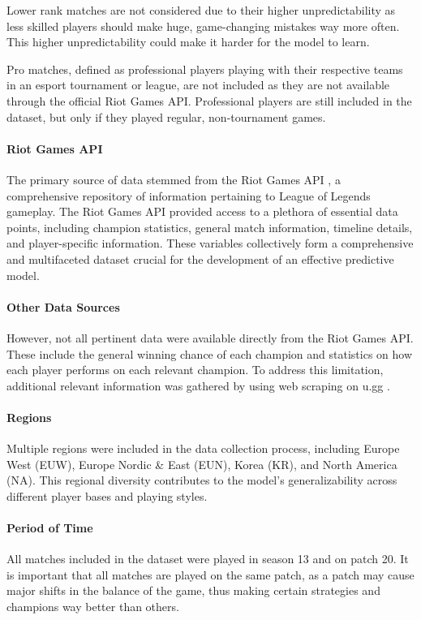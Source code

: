 \documentclass[12pt, a4paper, headinclude, twoside, plainheadsepline, open=right, numbers=noenddot, hidelinks, toc=listof, toc=bibliography]{scrreprt}
\begin{document}
Lower rank matches are not considered due to their higher unpredictability as less skilled players should make huge, game-changing mistakes way more often.
This higher unpredictability could make it harder for the model to learn.

Pro matches, defined as professional players playing with their respective teams in an esport tournament or league, are not included as they are not available through the official Riot Games API.
Professional players are still included in the dataset, but only if they played regular, non-tournament games.

\paragraph{Riot Games API}
The primary source of data stemmed from the Riot Games API \cite{RiotDeveloperPortal}, a comprehensive repository of information pertaining to League of Legends gameplay.
The Riot Games API provided access to a plethora of essential data points, including champion statistics, general match information, timeline details, and player-specific information.
These variables collectively form a comprehensive and multifaceted dataset crucial for the development of an effective predictive model.
\paragraph{Other Data Sources}
However, not all pertinent data were available directly from the Riot Games API.
These include the general winning chance of each champion and statistics on how each player performs on each relevant champion.
To address this limitation, additional relevant information was gathered by using web scraping on u.gg \cite{GGBestLeague}.
\paragraph{Regions}
Multiple regions were included in the data collection process, including Europe West (EUW), Europe Nordic \& East (EUN), Korea (KR), and North America (NA).
This regional diversity contributes to the model's generalizability across different player bases and playing styles.
\paragraph{Period of Time}
All matches included in the dataset were played in season 13 and on patch 20.
It is important that all matches are played on the same patch, as a patch may cause major shifts in the balance of the game, thus making certain strategies and champions way better than others.
\end{document}

